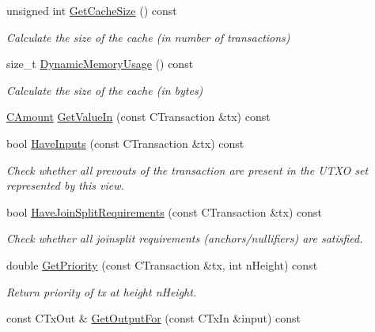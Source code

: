 \begin{DoxyCompactItemize}
\item 
unsigned int \mbox{\hyperlink{class_c_coins_view_cache_a937e30d96fd43e403c862b193cf5b942}{Get\+Cache\+Size}} () const
\begin{DoxyCompactList}\small\item\em Calculate the size of the cache (in number of transactions) \end{DoxyCompactList}\item 
size\+\_\+t \mbox{\hyperlink{class_c_coins_view_cache_adc01927480b99814280a4388e738d8b9}{Dynamic\+Memory\+Usage}} () const
\begin{DoxyCompactList}\small\item\em Calculate the size of the cache (in bytes) \end{DoxyCompactList}\item 
\mbox{\hyperlink{amount_8h_a4eaf3a5239714d8c45b851527f7cb564}{C\+Amount}} \mbox{\hyperlink{class_c_coins_view_cache_a1a8cd6069fba96939ffcb1bd36ffb921}{Get\+Value\+In}} (const C\+Transaction \&tx) const
\item 
bool \mbox{\hyperlink{class_c_coins_view_cache_a5b1abd71c95dc7be2523b9c28839ec29}{Have\+Inputs}} (const C\+Transaction \&tx) const
\begin{DoxyCompactList}\small\item\em Check whether all prevouts of the transaction are present in the U\+T\+XO set represented by this view. \end{DoxyCompactList}\item 
bool \mbox{\hyperlink{class_c_coins_view_cache_ae4d444ac347873a2c372ac86ca676d50}{Have\+Join\+Split\+Requirements}} (const C\+Transaction \&tx) const
\begin{DoxyCompactList}\small\item\em Check whether all joinsplit requirements (anchors/nullifiers) are satisfied. \end{DoxyCompactList}\item 
double \mbox{\hyperlink{class_c_coins_view_cache_a111d5a94709eaccd57bafe6ab1d938af}{Get\+Priority}} (const C\+Transaction \&tx, int n\+Height) const
\begin{DoxyCompactList}\small\item\em Return priority of tx at height n\+Height. \end{DoxyCompactList}\item 
const C\+Tx\+Out \& \mbox{\hyperlink{class_c_coins_view_cache_a54a0de51586fa92d83cfa321fb8936c5}{Get\+Output\+For}} (const C\+Tx\+In \&input) const
\end{DoxyCompactItemize}
